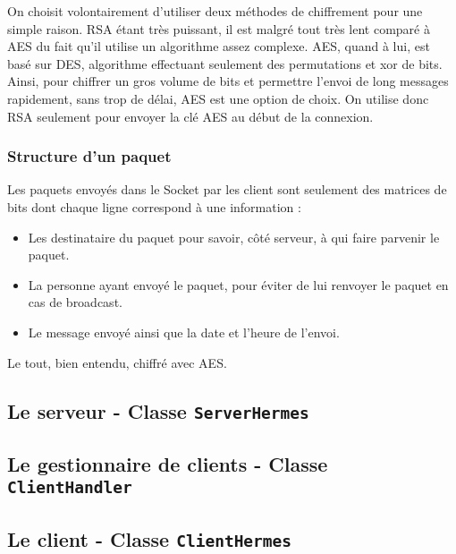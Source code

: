 \documentclass{article}
\begin{document}
On choisit volontairement d'utiliser deux méthodes de chiffrement pour une simple raison. 
RSA étant très puissant, il est malgré tout très lent comparé à AES du fait qu'il utilise un algorithme assez complexe. 
AES, quand à lui, est basé sur DES, algorithme effectuant seulement des permutations et xor de bits. 
Ainsi, pour chiffrer un gros volume de bits et permettre l'envoi de long messages rapidement, sans trop de délai, AES est une option de choix. 
On utilise donc RSA seulement pour envoyer la clé AES au début de la connexion. 

\subsubsection{Structure d'un paquet}

Les paquets envoyés dans le Socket par les client sont seulement des matrices de bits dont chaque ligne correspond à une information :
\begin{itemize}
    \item Les destinataire du paquet pour savoir, côté serveur, à qui faire parvenir le paquet. 
    \item La personne ayant envoyé le paquet, pour éviter de lui renvoyer le paquet en cas de broadcast. 
    \item Le message envoyé ainsi que la date et l'heure de l'envoi. 
\end{itemize}
Le tout, bien entendu, chiffré avec AES. 

\subsection{Le serveur - Classe \texttt{ServerHermes}}

\subsection{Le gestionnaire de clients - Classe \texttt{ClientHandler}}

\subsection{Le client - Classe \texttt{ClientHermes}}
\end{document}
